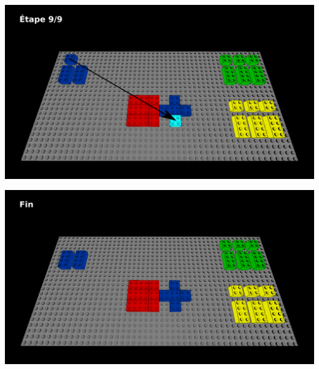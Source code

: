\documentclass[aspectratio=169]{beamer}
\begin{document}
\begin{frame}
  \includegraphics[width=\linewidth]{step9.png}
\end{frame}

\begin{frame}
  \includegraphics[width=\linewidth]{end.png}
\end{frame}
\end{document}
